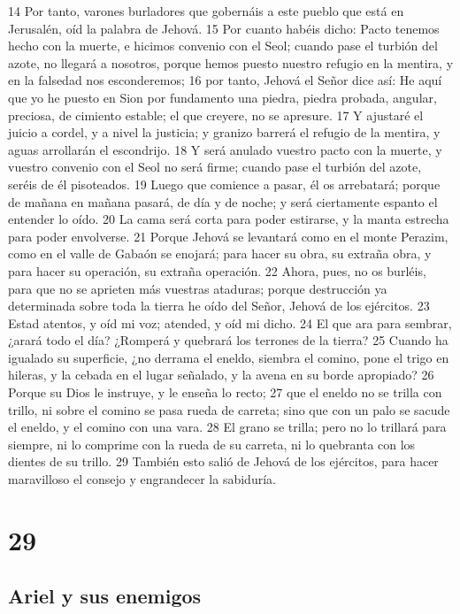 14 Por tanto, varones burladores que gobernáis a este pueblo que está en Jerusalén, oíd la palabra de Jehová.
15 Por cuanto habéis dicho: Pacto tenemos hecho con la muerte, e hicimos convenio con el Seol; cuando pase el turbión del azote, no llegará a nosotros, porque hemos puesto nuestro refugio en la mentira, y en la falsedad nos esconderemos;
16 por tanto, Jehová el Señor dice así: He aquí que yo he puesto en Sion por fundamento una piedra, piedra probada, angular, preciosa, de cimiento estable; el que creyere, no se apresure.
17 Y ajustaré el juicio a cordel, y a nivel la justicia; y granizo barrerá el refugio de la mentira, y aguas arrollarán el escondrijo.
18 Y será anulado vuestro pacto con la muerte, y vuestro convenio con el Seol no será firme; cuando pase el turbión del azote, seréis de él pisoteados.
19 Luego que comience a pasar, él os arrebatará; porque de mañana en mañana pasará, de día y de noche; y será ciertamente espanto el entender lo oído.
20 La cama será corta para poder estirarse, y la manta estrecha para poder envolverse.
21 Porque Jehová se levantará como en el monte Perazim, como en el valle de Gabaón se enojará; para hacer su obra, su extraña obra, y para hacer su operación, su extraña operación.
22 Ahora, pues, no os burléis, para que no se aprieten más vuestras ataduras; porque destrucción ya determinada sobre toda la tierra he oído del Señor, Jehová de los ejércitos.
23 Estad atentos, y oíd mi voz; atended, y oíd mi dicho.
24 El que ara para sembrar, ¿arará todo el día? ¿Romperá y quebrará los terrones de la tierra?
25 Cuando ha igualado su superficie, ¿no derrama el eneldo, siembra el comino, pone el trigo en hileras, y la cebada en el lugar señalado, y la avena en su borde apropiado?
26 Porque su Dios le instruye, y le enseña lo recto;
27 que el eneldo no se trilla con trillo, ni sobre el comino se pasa rueda de carreta; sino que con un palo se sacude el eneldo, y el comino con una vara.
28 El grano se trilla; pero no lo trillará para siempre, ni lo comprime con la rueda de su carreta, ni lo quebranta con los dientes de su trillo.
29 También esto salió de Jehová de los ejércitos, para hacer maravilloso el consejo y engrandecer la sabiduría.

\chapter{29}

\section*{Ariel y sus enemigos}

